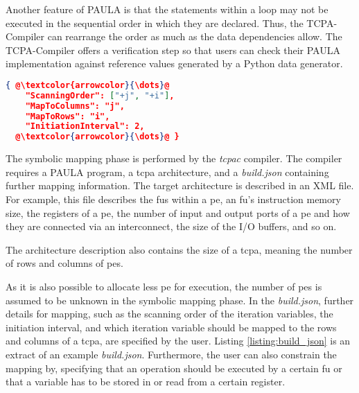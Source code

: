 Another feature of PAULA is that the statements within a loop may not be executed in the sequential order in which they are declared.
Thus, the TCPA-Compiler can rearrange the order as much as the data dependencies allow.
The TCPA-Compiler offers a verification step so that users can check their PAULA implementation against reference values generated by a Python data generator.

\begin{lstlisting}[language=JSON, float, escapechar=@, caption=Excerpt of build.json that specifies scanning order and which iteration variable is mapped to \ac{tcpa} row and column., captionpos=b, label=listing:build_json]
{ @\textcolor{arrowcolor}{\dots}@ 
    "ScanningOrder": ["+j", "+i"],
    "MapToColumns": "j",
    "MapToRows": "i",
    "InitiationInterval": 2,
  @\textcolor{arrowcolor}{\dots}@ }
\end{lstlisting}

The symbolic mapping phase is performed by the \textit{tcpac} compiler.
The compiler requires a PAULA program, a \ac{tcpa} architecture, and a \textit{build.json} containing further mapping information.
The target architecture is described in an XML file.
For example, this file describes the \acp{fu} within a \ac{pe}, an \ac{fu}'s instruction memory size, the registers of a \ac{pe}, the number of input and output ports of a \ac{pe} and how they are connected via an interconnect, the size of the I/O buffers, and so on.

The architecture description also contains the size of a \ac{tcpa}, meaning the number of rows and columns of \acp{pe}.

As it is also possible to allocate less \ac{pe} for execution, the number of \acp{pe} is assumed to be unknown in the symbolic mapping phase.
In the \textit{build.json}, further details for mapping, such as the scanning order of the iteration variables, the initiation interval, and which iteration variable should be mapped to the rows and columns of a \ac{tcpa}, are specified by the user.
Listing \ref{listing:build_json} is an extract of an example \textit{build.json}.
Furthermore, the user can also constrain the mapping by, \eg specifying that an operation should be executed by a certain \ac{fu} or that a variable has to be stored in or read from a certain register.

